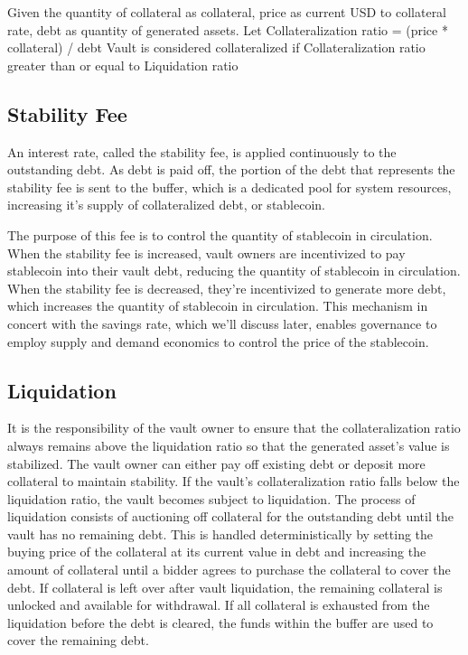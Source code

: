 \documentclass[12pt]{article}
\begin{document}
Given the quantity of collateral as collateral, price as current USD to collateral rate, debt as quantity of generated assets.
Let Collateralization ratio = (price * collateral) / debt
Vault is considered collateralized if Collateralization ratio greater than or equal to Liquidation ratio


\subsection{Stability Fee}


An interest rate, called the stability fee, is applied continuously to the outstanding debt. As debt is paid off, the portion of the debt that represents the stability fee is sent to the buffer, which is a dedicated pool for system resources, increasing it's supply of collateralized debt, or stablecoin.

The purpose of this fee is to control the quantity of stablecoin in circulation. When the stability fee is increased, vault owners are incentivized to pay stablecoin into their vault debt, reducing the quantity of stablecoin in circulation. When the stability fee is decreased, they're incentivized to generate more debt, which increases the quantity of stablecoin in circulation. This mechanism in concert with the savings rate, which we'll discuss later, enables governance to employ supply and demand economics to control the price of the stablecoin.

\subsection{Liquidation}

It is the responsibility of the vault owner to ensure that the collateralization ratio always remains above the liquidation ratio so that the generated asset's value is stabilized. The vault owner can either pay off existing debt or deposit more collateral to maintain stability. If the vault's collateralization ratio falls below the liquidation ratio, the vault becomes subject to liquidation. The process of liquidation consists of auctioning off collateral for the outstanding debt until the vault has no remaining debt. This is handled deterministically by setting the buying price of the collateral at its current value in debt and increasing the amount of collateral until a bidder agrees to purchase the collateral to cover the debt. If collateral is left over after vault liquidation, the remaining collateral is unlocked and available for withdrawal. If all collateral is exhausted from the liquidation before the debt is cleared, the funds within the buffer are used to cover the remaining debt.
\end{document}
